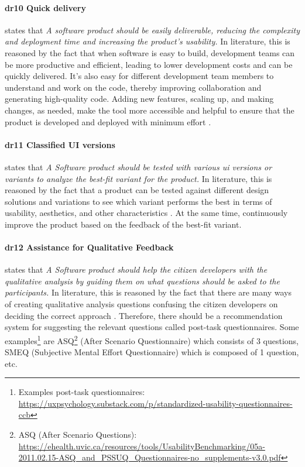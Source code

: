 \paragraph{\ac{dr}10 Quick delivery} states that \textit{A software product should be easily deliverable, reducing the complexity and deployment time and increasing the product's usability.} 
In literature, this is reasoned by the fact that when software is easy to build, development teams can be more productive and efficient, leading to lower development costs \cite{misc:lowcode:platforms} and can be quickly delivered. 
It's also easy for different development team members to understand and work on the code, thereby improving collaboration \cite{misc:prorotypes:lauff} and generating high-quality code.
Adding new features, scaling up, and making changes, as needed, make the tool more accessible and helpful \cite{article:prototyping:lowcode} to ensure that the product is developed and deployed with minimum effort \cite{article:prototyping:lowcode}.

\paragraph*{\ac{dr}11 Classified UI versions} states that \textit{A Software product should be tested with various \ac{ui} versions or variants to analyze the best-fit variant for the product.}
In literature, this is reasoned by the fact that a product can be tested against different design solutions and variations \cite{article:CE:fitzgerald} to see which variant performs the best in terms of usability, aesthetics, and other characteristics \cite{article:controlled:experiements}. 
At the same time, continuously improve \cite{article:CE:ros} the product based on the feedback of the best-fit variant.

\paragraph*{\ac{dr}12 Assistance for Qualitative Feedback} states that \textit{A Software product should help the citizen developers with the qualitative analysis by guiding them on what questions should be asked to the participants.}
In literature, this is reasoned by the fact that there are many ways of creating qualitative analysis questions \cite{misc:dsr:mayring} confusing the citizen developers on deciding the correct approach \cite{misc:qualitative:qualitative}.
Therefore, there should be a recommendation system for suggesting the relevant questions called post-task questionnaires.
Some examples\footnote{Examples post-task questionnaires: \url{https://uxpsychology.substack.com/p/standardized-usability-questionnaires-ccb}} are ASQ\footnote{ASQ (After Scenario Questions): \url{https://ehealth.uvic.ca/resources/tools/UsabilityBenchmarking/05a-2011.02.15-ASQ_and_PSSUQ_Questionnaires-no_supplements-v3.0.pdf}} (After Scenario Questionnaire) which consists of 3 questions, SMEQ (Subjective Mental Effort Questionnaire) which is composed of 1 question, etc. 
